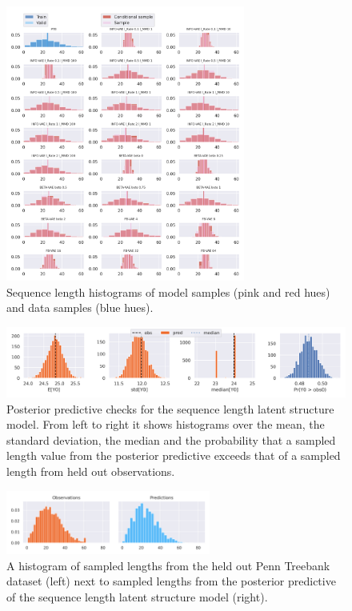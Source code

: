 \begin{figure}[!htb]
    \centering
    \includegraphics[width=0.7\textwidth]{images/bda_checks/pbt_seq_len/sequence_lengths_hists.png}
    \caption{Sequence length histograms of model samples (pink and red hues) and data samples (blue hues).}
    \label{fig:ptb_data_model_length_distributions}
\end{figure}

\begin{figure}[!htb]
    \centering
    \includegraphics[width=\textwidth]{images/bda_checks/pbt_seq_len/posterior_predictive_check_pvals.png}
    \caption{Posterior predictive checks for the sequence length latent structure model. From left to right it shows histograms over the mean, the standard deviation, the median and the probability that a sampled length value from the posterior predictive exceeds that of a sampled length from held out observations.}
    \label{fig:bda_check_ptb_seq_len_posterior_predictive_checks_1}
\end{figure}

\begin{figure}[!htb]
    \centering
    \includegraphics[width=0.6\textwidth]{images/bda_checks/pbt_seq_len/posterior_predictive_check_preds.png}
    \caption{A histogram of sampled lengths from the held out Penn Treebank dataset (left) next to sampled lengths from the posterior predictive of the sequence length latent structure model (right).}
    \label{fig:bda_check_ptb_seq_len_posterior_predictive_checks_2}
\end{figure}

